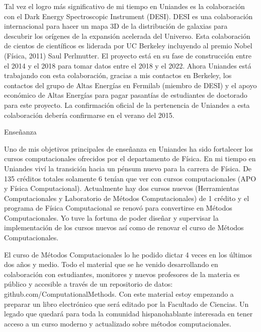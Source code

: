 Tal vez el logro más significativo de mi tiempo en Uniandes es la
colaboración con el Dark Energy Spectroscopic Instrument (DESI). DESI
es una colaboración internacional para hacer un mapa 3D de la
distribución de galaxias para descubrir los orígenes de la expansión
acelerada del Universo. Esta colaboración de cientos de científicos es
liderada por UC Berkeley incluyendo al premio Nobel (Física, 2011)
Saul Perlmutter. El proyecto está en su fase de construcción entre el
2014 y el 2018 para tomar datos entre el 2018 y el 2022. Ahora
Uniandes está trabajando con esta colaboración, gracias a mis
contactos en Berkeley, los contactos del grupo de Altas Energías en
Fermilab (miembro de DESI) y el apoyo económico de Altas Energías para
pagar pasantías de estudiantes de doctorado para este proyecto. La
confirmación oficial de la pertenencia de Uniandes a esta colaboración
debería confirmarse en el verano del 2015. 



Enseñanza



Uno de mis objetivos principales de enseñanza en
Uniandes ha sido fortalecer los cursos computacionales ofrecidos por
el departamento de Física. En mi tiempo en Uniandes viví la transición
hacia un pénsum nuevo para la carrera de Física. De 135 créditos
totales solamente 6 tenían que ver con cursos computacionales (APO y
Física Computacional). Actualmente hay dos cursos nuevos (Herramientas
Computacionales y Laboratorio de Métodos Computacionales) de 1 crédito
y el programa de Física Computacional se renovó para convertirse en
Métodos Computacionales. Yo tuve la fortuna de poder diseñar y
supervisar la implementación de los cursos nuevos así como de renovar
el curso de Métodos  Computacionales. 

El curso de Métodos Computacionales lo he podido dictar 4 veces en los
últimos dos años y medio. Todo el material que se he venido
desarrollando en colaboración con estudiantes, monitores y nuevos
profesores de la materia es público y accesible a través de un
repositorio de datos: github.com/ComputationalMethods.
Con este material estoy empezando a preparar un libro electrónico que
será editado por la Facultado de Ciencias. Un legado que quedará para
toda la comunidad hispanohablante interesada en tener acceso a un
curso moderno y actualizado sobre métodos computacionales.


